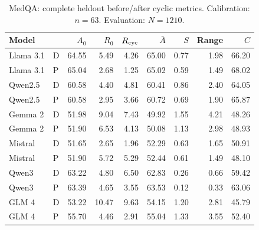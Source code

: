 \begin{table}[H]
\centering\small\setlength{\tabcolsep}{5pt}
\caption{MedQA: complete heldout before/after cyclic metrics. Calibration: $n=63$. Evaluation: $N=1210$.}\label{tab:corrected-medqa}
\begin{tabular}{llrrrrrrr}
\toprule
Model &  & $A_0$ & $R_0$ & $R_{\rm cyc}$ & $\bar A$ & $S$ & Range & $C$\\
\midrule
Llama 3.1 & D & 64.55 & 5.49 & 4.26 & 65.00 & 0.77 & 1.98 & 66.20\\
Llama 3.1 & P & 65.04 & 2.68 & 1.25 & 65.02 & 0.59 & 1.49 & 68.02\\
Qwen2.5 & D & 60.58 & 4.40 & 4.81 & 60.41 & 0.86 & 2.40 & 64.05\\
Qwen2.5 & P & 60.58 & 2.95 & 3.66 & 60.72 & 0.69 & 1.90 & 65.87\\
Gemma 2 & D & 51.98 & 9.04 & 7.43 & 49.92 & 1.55 & 4.21 & 48.26\\
Gemma 2 & P & 51.90 & 6.53 & 4.13 & 50.08 & 1.13 & 2.98 & 48.93\\
Mistral & D & 51.65 & 2.65 & 1.96 & 52.29 & 0.63 & 1.65 & 50.91\\
Mistral & P & 51.90 & 5.72 & 5.29 & 52.44 & 0.61 & 1.49 & 48.10\\
Qwen3 & D & 63.22 & 4.80 & 6.50 & 62.83 & 0.26 & 0.66 & 59.42\\
Qwen3 & P & 63.39 & 4.65 & 3.55 & 63.53 & 0.12 & 0.33 & 63.06\\
GLM 4 & D & 53.22 & 10.47 & 9.63 & 54.15 & 1.20 & 2.81 & 45.79\\
GLM 4 & P & 55.70 & 4.46 & 2.91 & 55.04 & 1.33 & 3.55 & 52.40\\
\bottomrule
\end{tabular}
\end{table}


